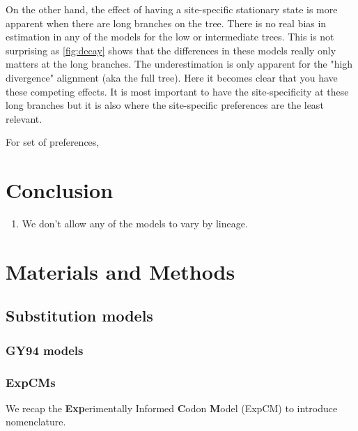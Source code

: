 \documentclass[11pt]{article}
\begin{document}
On the other hand, the effect of having a site-specific stationary state is more apparent when there are long branches on the tree.
There is no real bias in estimation in any of the models for the low or intermediate trees. 
This is not surprising as \ref{fig:decay} shows that the differences in these models really only matters at the long branches. 
The underestimation is only apparent for the "high divergence" alignment (aka the full tree). 
Here it becomes clear that you have these competing effects. 
It is most important to have the site-specificity at these long branches but it is also where the site-specific preferences are the least relevant. 


For set of preferences, 
\section*{Conclusion}

\begin{enumerate}
  \item We don't allow any of the models to vary by lineage. 
\end{enumerate}

\newpage
\section*{Materials and Methods}

\subsection*{Substitution models}
\subsubsection*{GY94 models}
\subsubsection*{ExpCMs}
We recap the \textbf{Exp}erimentally Informed \textbf{C}odon \textbf{M}odel (ExpCM) \citep{bloom2014experimentally,bloom2014informed,bloom2017identification,hilton2017phydms} to introduce nomenclature. 
\end{document}
